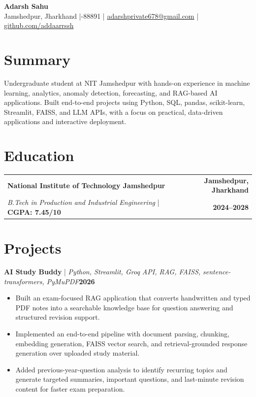 \documentclass[10pt,a4paper]{article}
\newcommand{\resumeItem}[1]{\item \small{#1}}
\newcommand{\projectHeading}[3]{%
  \vspace{3pt}\noindent\textbf{#1} \;|\; \textit{\small #2}\hfill \textbf{\small #3}\par\vspace{-2pt}
}
\begin{document}
\begin{center}
  {\LARGE\bfseries\color{primary} Adarsh Sahu}\\[3pt]
  \small Jamshedpur, Jharkhand \;|-88891 \;|\;
  \href{mailto:adarshprivate678@gmail.com}{\color{accent}adarshprivate678@gmail.com} \;|\;
  \href{https://github.com/addaarrssh}{\color{accent}github.com/addaarrssh}
\end{center}

\section{Summary}
\small Undergraduate student at NIT Jamshedpur with hands-on experience in machine learning, analytics, anomaly detection, forecasting, and RAG-based AI applications. Built end-to-end projects using Python, SQL, pandas, scikit-learn, Streamlit, FAISS, and LLM APIs, with a focus on practical, data-driven applications and interactive deployment.

\section{Education}
\begin{tabularx}{\textwidth}{@{}X r@{}}
  \textbf{National Institute of Technology Jamshedpur} & \textbf{Jamshedpur, Jharkhand} \\
  \textit{B.Tech in Production and Industrial Engineering} \;|\; \textbf{CGPA: 7.45/10} & \textbf{2024--2028}
\end{tabularx}

\section{Projects}

\projectHeading{AI Study Buddy}{Python, Streamlit, Groq API, RAG, FAISS, sentence-transformers, PyMuPDF}{2026}
\begin{itemize}
  \resumeItem{Built an exam-focused RAG application that converts handwritten and typed PDF notes into a searchable knowledge base for question answering and structured revision support.}
  \resumeItem{Implemented an end-to-end pipeline with document parsing, chunking, embedding generation, FAISS vector search, and retrieval-grounded response generation over uploaded study material.}
  \resumeItem{Added previous-year-question analysis to identify recurring topics and generate targeted summaries, important questions, and last-minute revision content for faster exam preparation.}
\end{itemize}
\end{document}
